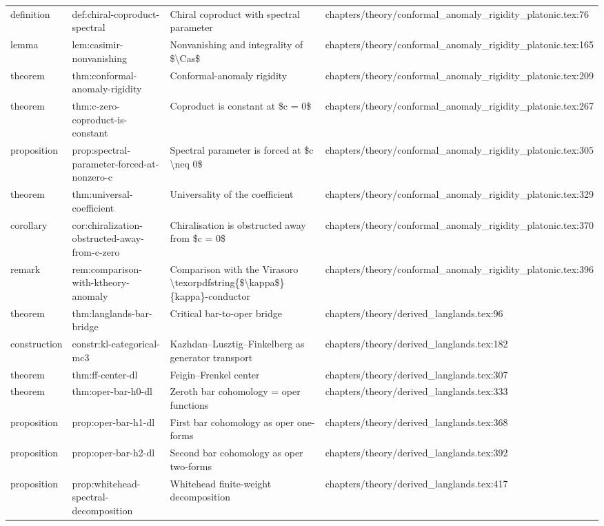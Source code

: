\documentclass[11pt]{article}
\begin{document}
\begin{longtable}{L{0.10\textwidth}L{0.26\textwidth}L{0.42\textwidth}L{0.22\textwidth}}
definition & def:chiral-coproduct-spectral & Chiral coproduct with spectral parameter & chapters/theory/conformal\_anomaly\_rigidity\_platonic.tex:76\\
lemma & lem:casimir-nonvanishing & Nonvanishing and integrality of \$\textbackslash{}Cas\$ & chapters/theory/conformal\_anomaly\_rigidity\_platonic.tex:165\\
theorem & thm:conformal-anomaly-rigidity & Conformal-anomaly rigidity & chapters/theory/conformal\_anomaly\_rigidity\_platonic.tex:209\\
theorem & thm:c-zero-coproduct-is-constant & Coproduct is constant at \$c = 0\$ & chapters/theory/conformal\_anomaly\_rigidity\_platonic.tex:267\\
proposition & prop:spectral-parameter-forced-at-nonzero-c & Spectral parameter is forced at \$c \textbackslash{}neq 0\$ & chapters/theory/conformal\_anomaly\_rigidity\_platonic.tex:305\\
theorem & thm:universal-coefficient & Universality of the coefficient & chapters/theory/conformal\_anomaly\_rigidity\_platonic.tex:329\\
corollary & cor:chiralization-obstructed-away-from-c-zero & Chiralisation is obstructed away from \$c = 0\$ & chapters/theory/conformal\_anomaly\_rigidity\_platonic.tex:370\\
remark & rem:comparison-with-ktheory-anomaly & Comparison with the Virasoro \textbackslash{}texorpdfstring\{\$\textbackslash{}kappa\$\}\{kappa\}-conductor & chapters/theory/conformal\_anomaly\_rigidity\_platonic.tex:396\\
theorem & thm:langlands-bar-bridge & Critical bar-to-oper bridge & chapters/theory/derived\_langlands.tex:96\\
construction & constr:kl-categorical-mc3 & Kazhdan--Lusztig--Finkelberg as generator transport & chapters/theory/derived\_langlands.tex:182\\
theorem & thm:ff-center-dl & Feigin--Frenkel center & chapters/theory/derived\_langlands.tex:307\\
theorem & thm:oper-bar-h0-dl & Zeroth bar cohomology = oper functions & chapters/theory/derived\_langlands.tex:333\\
proposition & prop:oper-bar-h1-dl & First bar cohomology as oper one-forms & chapters/theory/derived\_langlands.tex:368\\
proposition & prop:oper-bar-h2-dl & Second bar cohomology as oper two-forms & chapters/theory/derived\_langlands.tex:392\\
proposition & prop:whitehead-spectral-decomposition & Whitehead finite-weight decomposition & chapters/theory/derived\_langlands.tex:417\\

\end{longtable}
\end{document}
